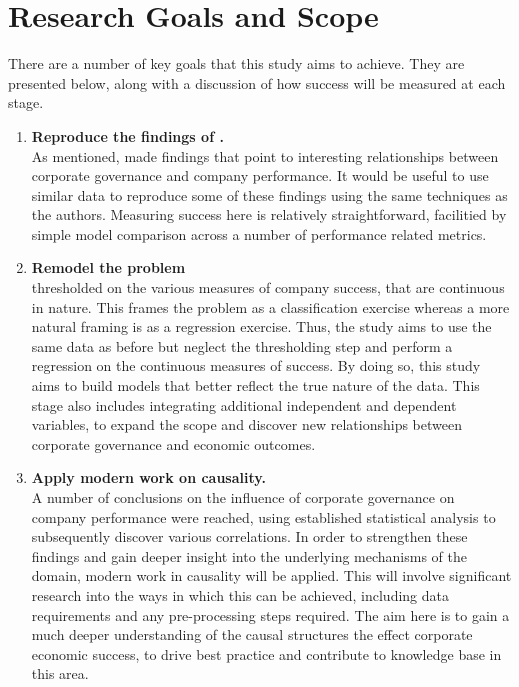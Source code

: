 \section{Research Goals and Scope}{\label{RGAS}}
{There are a number of key goals that this study aims to achieve. They are presented below, along with a discussion of how success will be measured at each stage.
\begin{enumerate}
\item{\bf {Reproduce the findings of \cite{moldovan2015learning}}.}\\
{As mentioned, \cite{moldovan2015learning} made findings that point to interesting relationships between corporate governance and company performance. It would be useful to use similar data to reproduce some of these findings using the same techniques as the authors. Measuring success here is relatively straightforward, facilitied by simple model comparison across a number of performance related metrics. }
\item{\bf {Remodel the problem}}\\
{\cite{moldovan2015learning} thresholded on the various measures of company success, that are continuous in nature. This frames the problem as a classification exercise whereas a more natural framing is as a regression exercise. Thus, the study aims to use the same data as before but neglect the thresholding step and perform a regression on the continuous measures of success. By doing so, this study aims to build models that better reflect the true nature of the data. This stage also includes integrating additional independent and dependent variables, to expand the scope and discover new relationships between corporate governance and economic outcomes.    }
\item{\bf {Apply modern work on causality.}}\\
{A number of conclusions on the influence of corporate governance on company performance were reached, using established statistical analysis to subsequently discover various correlations. In order to strengthen these findings and gain deeper insight into the underlying mechanisms of the domain, modern work in causality will be applied. This will involve significant research into the ways in which this can be achieved, including data requirements and any pre-processing steps required. The aim here is to gain a much deeper understanding of the causal structures the effect corporate economic success, to drive best practice and contribute to knowledge base in this area. }
\end{enumerate}
}
